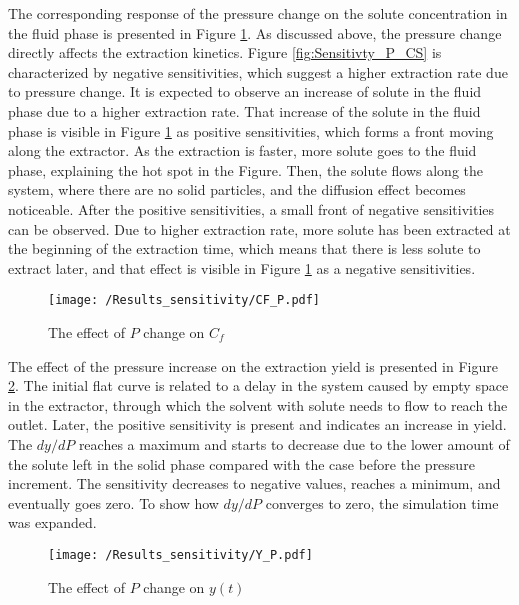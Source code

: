\documentclass[../Article_Model_Parameters.tex]{subfiles}
\begin{document}
	The corresponding response of the pressure change on the solute concentration in the fluid phase is presented in Figure \ref{fig:Sensitivty_P_CF}. As discussed above, the pressure change directly affects the extraction kinetics. Figure \ref{fig:Sensitivty_P_CS} is characterized by negative sensitivities, which suggest a higher extraction rate due to pressure change. It is expected to observe an increase of solute in the fluid phase due to a higher extraction rate. That increase of the solute in the fluid phase is visible in Figure \ref{fig:Sensitivty_P_CF} as positive sensitivities, which forms a front moving along the extractor. As the extraction is faster, more solute goes to the fluid phase, explaining the hot spot in the Figure. Then, the solute flows along the system, where there are no solid particles, and the diffusion effect becomes noticeable. After the positive sensitivities, a small front of negative sensitivities can be observed. Due to higher extraction rate, more solute has been extracted at the beginning of the extraction time, which means that there is less solute to extract later, and that effect is visible in Figure \ref{fig:Sensitivty_P_CF} as a negative sensitivities.

	\begin{figure}[h!]
		\centering
		\texttt{[image: /Results\_sensitivity/CF\_P.pdf]}
		\caption{The effect of $P$ change on $C_f$}
		\label{fig:Sensitivty_P_CF}
	\end{figure}

	The effect of the pressure increase on the extraction yield is presented in Figure \ref{fig:Sensitivty_P_y}. The initial flat curve is related to a delay in the system caused by empty space in the extractor, through which the solvent with solute needs to flow to reach the outlet. Later, the positive sensitivity is present and indicates an increase in yield. The $dy / dP$ reaches a maximum and starts to decrease due to the lower amount of the solute left in the solid phase compared with the case before the pressure increment. The sensitivity decreases to negative values, reaches a minimum, and eventually goes zero. To show how $dy / dP$ converges to zero, the simulation time was expanded.

	\begin{figure}[h!]
		\centering
		\texttt{[image: /Results\_sensitivity/Y\_P.pdf]}
		\caption{The effect of $P$ change on $y(t)$}
		\label{fig:Sensitivty_P_y}
	\end{figure}
\end{document}
